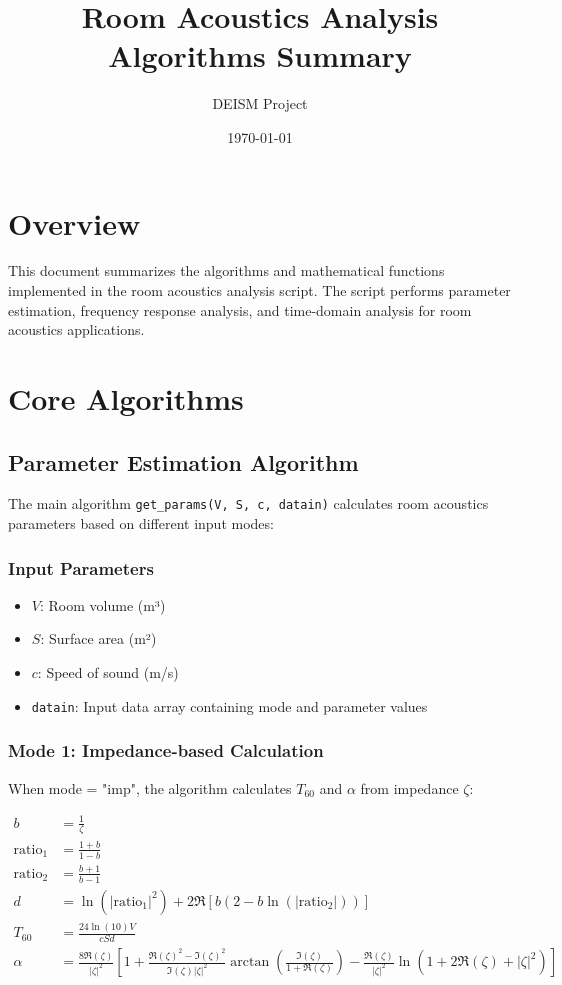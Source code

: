 \documentclass{article}
\title{Room Acoustics Analysis Algorithms Summary}
\author{DEISM Project}
\date{\today}
\begin{document}
\maketitle

\section{Overview}
This document summarizes the algorithms and mathematical functions implemented in the room acoustics analysis script. The script performs parameter estimation, frequency response analysis, and time-domain analysis for room acoustics applications.

\section{Core Algorithms}

\subsection{Parameter Estimation Algorithm}
The main algorithm \texttt{get\_params(V, S, c, datain)} calculates room acoustics parameters based on different input modes:

\subsubsection{Input Parameters}
\begin{itemize}
    \item $V$: Room volume (m³)
    \item $S$: Surface area (m²)
    \item $c$: Speed of sound (m/s)
    \item \texttt{datain}: Input data array containing mode and parameter values
\end{itemize}

\subsubsection{Mode 1: Impedance-based Calculation}
When mode = "imp", the algorithm calculates $T_{60}$ and $\alpha$ from impedance $\zeta$:

\begin{align}
b &= \frac{1}{\zeta} \\
\text{ratio}_1 &= \frac{1 + b}{1 - b} \\
\text{ratio}_2 &= \frac{b + 1}{b - 1} \\
d &= \ln(|\text{ratio}_1|^2) + 2\Re\left[b(2 - b\ln(|\text{ratio}_2|))\right] \\
T_{60} &= \frac{24\ln(10)V}{cSd} \\
\alpha &= \frac{8\Re(\zeta)}{|\zeta|^2}\left[1 + \frac{\Re(\zeta)^2 - \Im(\zeta)^2}{\Im(\zeta)|\zeta|^2}\arctan\left(\frac{\Im(\zeta)}{1 + \Re(\zeta)}\right) - \frac{\Re(\zeta)}{|\zeta|^2}\ln(1 + 2\Re(\zeta) + |\zeta|^2)\right]
\end{align}
\end{document}
